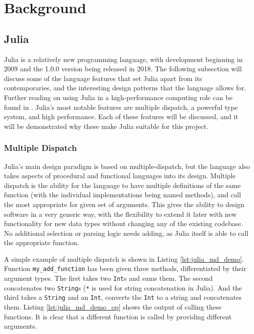 \section{Background}\label{sec:background}


\subsection{Julia}\label{sub_julia}
Julia is a relatively new programming language, with development beginning in 2009 and the 1.0.0 version being released in 2018. The following subsection will discuss some of the language features that set Julia apart from its contemporaries, and the interesting design patterns that the language allows for. Further reading on using Julia in a high-performance computing role can be found in \cite{Bezanson2017Julia:Computing}. Julia's most notable features are multiple dispatch, a powerful type system, and high performance. Each of these features will be discussed, and it will be demonstrated why these make Julia suitable for this project.

\subsubsection{Multiple Dispatch}\label{subsub_multiple_disp}
Julia's main design paradigm is based on multiple-dispatch, but the language also takes aspects of procedural and functional languages into its design. Multiple dispatch is the ability for the language to have multiple definitions of the same function (with the individual implementations being named methods), and call the most appropriate for given set of arguments. This gives the ability to design software in a very generic way, with the flexibility to extend it later with new functionality for new data types without changing any of the existing codebase. No additional selection or parsing logic needs adding, as Julia itself is able to call the appropriate function. 

A simple example of multiple dispatch is shown in Listing \ref{lst:julia_md_demo}. Function \texttt{my\_add\_function} has been given three methods, differentiated by their argument types. The first takes two \texttt{Int}s and sums them. The second concatenates two \texttt{String}s (\texttt{*} is used for string concatenation in Julia). And the third takes a \texttt{String} and an \texttt{Int}, converts the \texttt{Int} to a string and concatenates them. Listing \ref{lst:julia_md_demo_op} shows the output of calling these functions. It is clear that a different function is called by providing different arguments.

